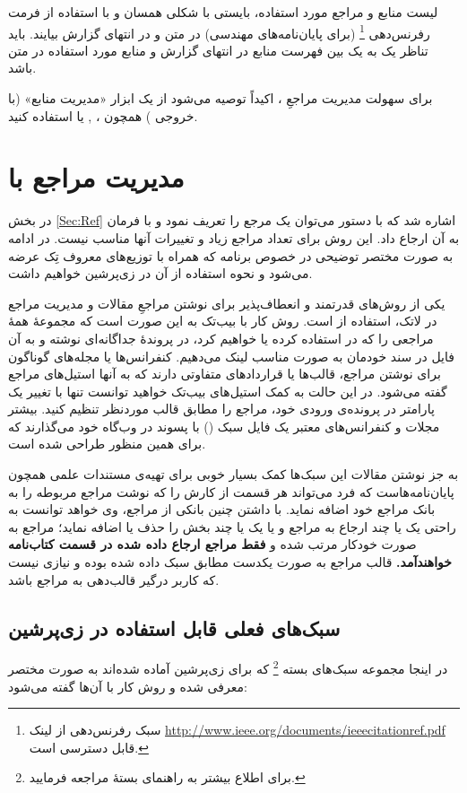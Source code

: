لیست منابع و مراجع مورد استفاده، بایستی با شکلی همسان و با استفاده از فرمت رفرنس‌دهی
%
\footnote{سبک رفرنس‌دهی  از لینک \url{http://www.ieee.org/documents/ieeecitationref.pdf} قابل دسترسی است.}
(برای پایان‌نامه‌های مهندسی)
در متن و در انتهای گزارش بیایند. باید تناظر یک به یک بین فهرست منابع در انتهای گزارش و منابع مورد استفاده در متن باشد.

برای سهولت مدیریت مراجعِ \پ%
، اکیداً توصیه می‌شود از یک ابزار «مدیریت منابع» (با خروجی
\texorpdfstring{}{Bib\TeX}%
) همچون
،
,
یا
استفاده کنید.

\section{ مدیریت مراجع با  \texorpdfstring{}{Bib\TeX} }
در بخش \ref{Sec:Ref} اشاره شد که با دستور 
  می‌توان یک مرجع را تعریف نمود و با فرمان
  به آن ارجاع داد. این روش برای تعداد مراجع زیاد و تغییرات آنها مناسب نیست. در ادامه به صورت مختصر توضیحی در خصوص برنامه  که همراه با توزیع‌های معروف تِک عرضه می‌شود و نحوه استفاده از آن در زی‌پرشین خواهیم داشت.

یکی از روش‌های قدرتمند و انعطاف‌پذیر برای نوشتن مراجعِ مقالات و مدیریت مراجع در لاتک، استفاده از   است.
 روش کار با بیب‌تک به این صورت است که مجموعهٔ همهٔ مراجعی را که در \پ استفاده کرده یا خواهیم کرد، 
در پروندهٔ جداگانه‌ای نوشته و به آن فایل در سند خودمان به صورت مناسب لینک می‌دهیم.
 کنفرانس‌ها یا مجله‌های گوناگون برای نوشتن مراجع، قالب‌ها یا قراردادهای متفاوتی دارند که به آنها استیل‌های مراجع گفته می‌شود.
 در این حالت به کمک ‌استیل‌های بیب‌تک خواهید توانست تنها با تغییر یک پارامتر در پرونده‌ی ورودی خود، مراجع را مطابق قالب موردنظر تنظیم کنید. 
 بیشتر مجلات و کنفرانس‌های معتبر یک فایل سبک
 ()
با پسوند  در وب‌گاه خود می‌گذارند که برای همین منظور طراحی شده است.

به جز نوشتن مقالات این سبک‌ها کمک بسیار خوبی برای تهیه‌ی مستندات علمی همچون پایان‌نامه‌هاست که فرد می‌تواند هر قسمت از کارش را که نوشت مراجع مربوطه را به بانک مراجع خود اضافه نماید. با داشتن چنین بانکی از مراجع، وی خواهد توانست به راحتی یک یا چند ارجاع به مراجع و یا یک یا چند بخش را حذف یا اضافه ‌نماید؛ 
مراجع به صورت خودکار مرتب شده و
\textbf{فقط مراجع ارجاع داده شده در قسمت کتاب‌نامه خواهندآمد.}
قالب مراجع به صورت یکدست مطابق سبک داده شده بوده و نیازی نیست که کاربر درگیر قالب‌دهی به مراجع باشد. 

\subsection{سبک‌های فعلی قابل استفاده در زی‌پرشین}
در اینجا مجموعه‌ سبک‌های بسته
%
\footnote{ برای اطلاع بیشتر به راهنمای بستهٔ
مراجعه فرمایید.}
که برای  زی‌پرشین آماده شده‌اند به صورت مختصر معرفی شده و روش کار با آن‌ها گفته می‌شود:

